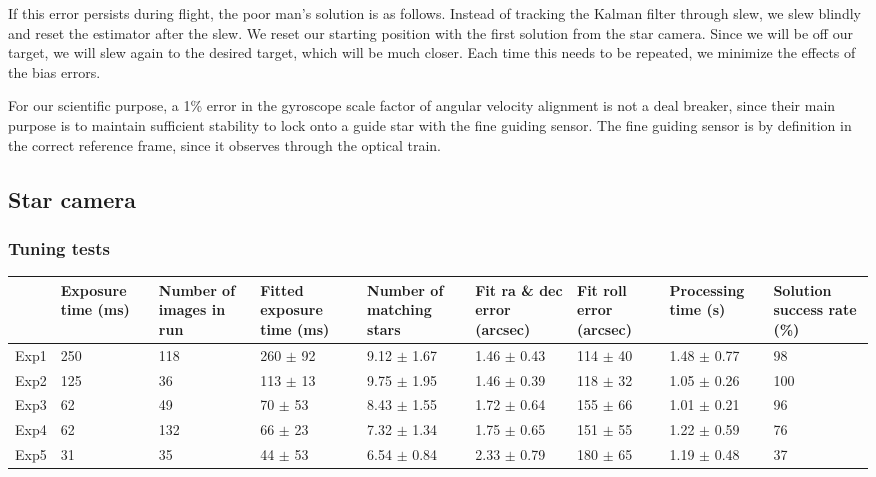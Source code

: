 If this error persists during flight, the poor man's solution is as follows. Instead of tracking the Kalman filter through slew, we slew blindly and reset the estimator after the slew. We reset our starting position with the first solution from the star camera. Since we will be off our target, we will slew again to the desired target, which will be much closer. Each time this needs to be repeated, we minimize the effects of the bias errors.

For our scientific purpose, a 1\% error in the gyroscope scale factor of angular velocity alignment is not a deal breaker, since their main purpose is to maintain sufficient stability to lock onto a guide star with the fine guiding sensor. The fine guiding sensor is by definition in the correct reference frame, since it observes through the optical train. 






\subsection{Star camera}

\subsubsection{Tuning tests}

\renewcommand{\arraystretch}{1.5}
\def\labelitemi{--}
\begin{table}[!h]
\scriptsize
\caption[Star camera tests]{Star camera exposure time tests.}
\label{tab:starCameraTests}
\vspace{-0.5cm}
\begin{longtable}{l|P{1.5cm}P{1cm}P{1.5cm}P{1.5cm}P{1.5cm}P{1.5cm}P{1.5cm}P{1.5cm}}													
\toprule																							
{} 	&	  Exposure time (ms)	&	  Number of images in run 	&	  Fitted exposure time (ms)			&	  Number of matching stars 			&	  Fit ra \& dec error (arcsec) 			&	Fit roll error (arcsec)			&	  Processing time (s)			&	  Solution success rate (\%)	\\
\midrule																											
Exp1 	&	250	&	118	&	260	$\pm$	92	&	9.12	$\pm$	1.67	&	1.46	$\pm$	0.43	&	114	$\pm$	40	&	1.48	$\pm$	0.77	&	98	\\
Exp2 	&	125	&	36	&	113	$\pm$	13	&	9.75	$\pm$	1.95	&	1.46	$\pm$	0.39	&	118	$\pm$	32	&	1.05	$\pm$	0.26	&	100	\\
Exp3 	&	62	&	49	&	70	$\pm$	53	&	8.43	$\pm$	1.55	&	1.72	$\pm$	0.64	&	155	$\pm$	66	&	1.01	$\pm$	0.21	&	96	\\
Exp4 	&	62	&	132	&	66	$\pm$	23	&	7.32	$\pm$	1.34	&	1.75	$\pm$	0.65	&	151	$\pm$	55	&	1.22	$\pm$	0.59	&	76	\\
Exp5 	&	31	&	35	&	44	$\pm$	53	&	6.54	$\pm$	0.84	&	2.33	$\pm$	0.79	&	180	$\pm$	65	&	1.19	$\pm$	0.48	&	37	\\
\bottomrule
\end{longtable}																							
\end{table}																							

